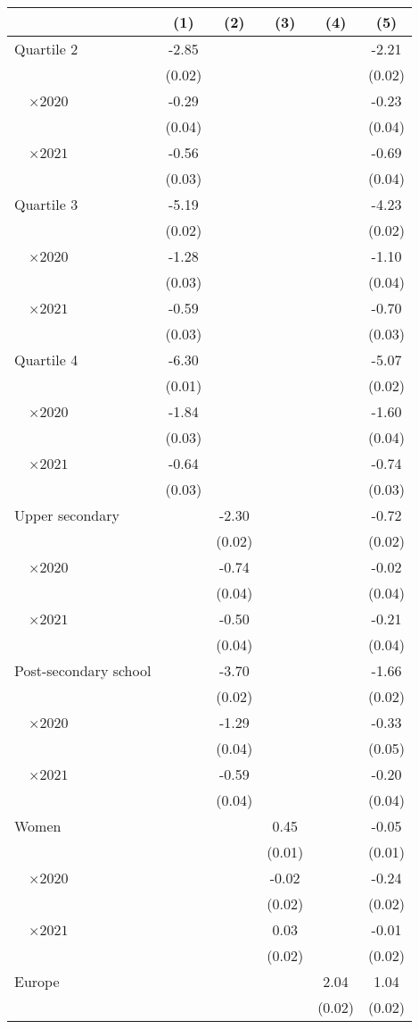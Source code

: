 
\begin{tabular}{@{}l*{5}{S[table-format={-}2.2{\tnote{***}}]}@{}}
\toprule
{} & {(1)} & {(2)} & {(3)} & {(4)} & {(5)}\tabularnewline%
\midrule
Quartile 2 & -2.85\tnote{***} &  &  &  & -2.21\tnote{***}\tabularnewline%
 & (0.02) &  &  &  & \vphantom{1} (0.02)\tabularnewline%
~~\(\times 2020\) & -0.29\tnote{***} &  &  &  & -0.23\tnote{***}\tabularnewline%
 & (0.04) &  &  &  & (0.04)\tabularnewline%
~~\(\times 2021\) & -0.56\tnote{***} &  &  &  & -0.69\tnote{***}\tabularnewline%
 & (0.03) &  &  &  & \vphantom{2} (0.04)\tabularnewline%
Quartile 3 & -5.19\tnote{***} &  &  &  & -4.23\tnote{***}\tabularnewline%
 & (0.02) &  &  &  & (0.02)\tabularnewline%
~~\(\times 2020\) & -1.28\tnote{***} &  &  &  & -1.10\tnote{***}\tabularnewline%
 & (0.03) &  &  &  & \vphantom{1} (0.04)\tabularnewline%
~~\(\times 2021\) & -0.59\tnote{***} &  &  &  & -0.70\tnote{***}\tabularnewline%
 & (0.03) &  &  &  & \vphantom{1} (0.03)\tabularnewline%
Quartile 4 & -6.30\tnote{***} &  &  &  & -5.07\tnote{***}\tabularnewline%
 & (0.01) &  &  &  & (0.02)\tabularnewline%
~~\(\times 2020\) & -1.84\tnote{***} &  &  &  & -1.60\tnote{***}\tabularnewline%
 & (0.03) &  &  &  & (0.04)\tabularnewline%
~~\(\times 2021\) & -0.64\tnote{***} &  &  &  & -0.74\tnote{***}\tabularnewline%
 & (0.03) &  &  &  & (0.03)\tabularnewline%
Upper secondary &  & -2.30\tnote{***} &  &  & -0.72\tnote{***}\tabularnewline%
 &  & (0.02) &  &  & \vphantom{1} (0.02)\tabularnewline%
~~\(\times 2020\) &  & -0.74\tnote{***} &  &  & -0.02\tabularnewline%
 &  & (0.04) &  &  & \vphantom{2} (0.04)\tabularnewline%
~~\(\times 2021\) &  & -0.50\tnote{***} &  &  & -0.21\tnote{***}\tabularnewline%
 &  & (0.04) &  &  & \vphantom{1} (0.04)\tabularnewline%
Post-secondary school &  & -3.70\tnote{***} &  &  & -1.66\tnote{***}\tabularnewline%
 &  & (0.02) &  &  & (0.02)\tabularnewline%
~~\(\times 2020\) &  & -1.29\tnote{***} &  &  & -0.33\tnote{***}\tabularnewline%
 &  & (0.04) &  &  & (0.05)\tabularnewline%
~~\(\times 2021\) &  & -0.59\tnote{***} &  &  & -0.20\tnote{***}\tabularnewline%
 &  & (0.04) &  &  & (0.04)\tabularnewline%
Women &  &  & 0.45\tnote{***} &  & -0.05\tnote{***}\tabularnewline%
 &  &  & (0.01) &  & (0.01)\tabularnewline%
~~\(\times 2020\) &  &  & -0.02 &  & -0.24\tnote{***}\tabularnewline%
 &  &  & (0.02) &  & \vphantom{1} (0.02)\tabularnewline%
~~\(\times 2021\) &  &  & 0.03\tnote{\dagger} &  & -0.01\tabularnewline%
 &  &  & (0.02) &  & (0.02)\tabularnewline%
Europe &  &  &  & 2.04\tnote{***} & 1.04\tnote{***}\tabularnewline%
 &  &  &  & (0.02) & \vphantom{1} (0.02)\tabularnewline%

\end{tabular}
